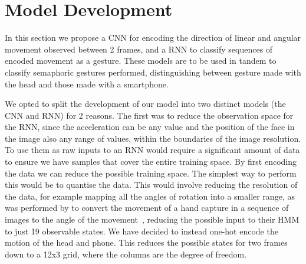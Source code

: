 \section{Model Development}
In this section we propose a CNN for encoding the direction of linear and angular movement observed between 2 frames, and a RNN to classify sequences of encoded movement as a gesture.
These models are to be used in tandem to classify semaphoric gestures performed, distinguishing between gesture made with the head and those made with a smartphone.

We opted to split the development of our model into two distinct models (the CNN and RNN) for 2 reasons.
The first was to reduce the observation space for the RNN, since the acceleration can be any value and the position of the face in the image also any range of values, within the boundaries of the image resolution.
To use them as raw inputs to an RNN would require a significant amount of data to ensure we have samples that cover the entire training space.
By first encoding the data we can reduce the possible training space.
The simplest way to perform this would be to quantise the data. This would involve reducing the resolution of the data, for example mapping all the angles of rotation into a smaller range, as was performed by \citeauthor{elmezain2008hidden} to convert the movement of a hand capture in a sequence of images to the angle of the movement~\cite{elmezain2008hidden}, reducing the possible input to their HMM to just 19 observable states.
We have decided to instead one-hot encode the motion of the head and phone. This reduces the possible states for two frames down to a 12x3 grid, where the columns are the degree of freedom.

